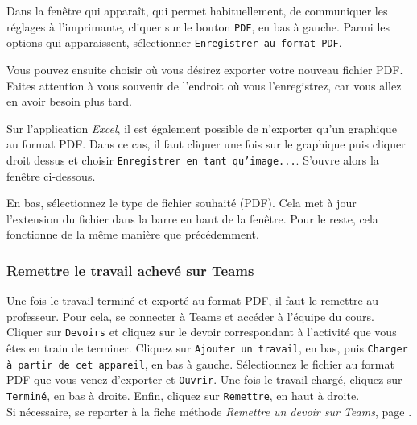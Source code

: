 Dans la fenêtre qui apparaît, qui permet habituellement, de communiquer les réglages à l'imprimante, cliquer sur le bouton \texttt{PDF}, en bas à gauche.  Parmi les options qui apparaissent, sélectionner \texttt{Enregistrer au format PDF}. 


Vous pouvez ensuite choisir où vous désirez exporter votre nouveau fichier PDF. Faites attention à vous souvenir de l'endroit où vous l'enregistrez, car vous allez en avoir besoin plus tard.


Sur l'application \emph{Excel}, il est également possible de n'exporter qu'un graphique au format PDF. Dans ce cas, il faut cliquer une fois sur le graphique puis cliquer droit dessus et choisir \texttt{Enregistrer en tant qu'image...}. S'ouvre alors la fenêtre ci-dessous.


En bas, sélectionnez le type de fichier souhaité (PDF).  Cela met à jour l'extension du fichier dans la barre en haut de la fenêtre.  Pour le reste, cela fonctionne de la même manière que précédemment.



\subsubsection{Remettre le travail achevé sur Teams}

Une fois le travail terminé et exporté au format PDF, il faut le remettre au professeur. Pour cela, se connecter à Teams et accéder à l'équipe du cours. Cliquer sur \texttt{Devoirs} et cliquez sur le devoir correspondant à l'activité que vous êtes en train de terminer. Cliquez sur \texttt{Ajouter un travail}, en bas, puis \texttt{Charger à partir de cet appareil}, en bas à gauche. Sélectionnez le fichier au format PDF que vous venez d'exporter et \texttt{Ouvrir}. Une fois le travail chargé, cliquez sur \texttt{Terminé}, en bas à droite. Enfin, cliquez sur \texttt{Remettre}, en haut à droite.\\



Si nécessaire, se reporter à la fiche méthode \emph{Remettre un devoir sur Teams}, page \pageref{TeamsRemettreDevoir}.



\poubelle{


}